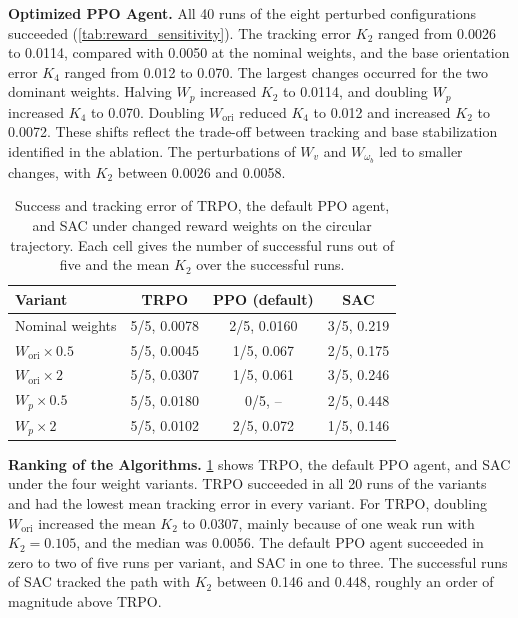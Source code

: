 \documentclass{ieeeaccess}
\begin{document}
\textbf{Optimized PPO Agent.} All 40 runs of the eight perturbed configurations succeeded
(\cref{tab:reward_sensitivity}). The tracking error $K_2$ ranged from 0.0026 to 0.0114, compared with
0.0050 at the nominal weights, and the base orientation error $K_4$ ranged from 0.012 to 0.070. The largest
changes occurred for the two dominant weights. Halving $W_p$ increased $K_2$ to 0.0114, and doubling $W_p$
increased $K_4$ to 0.070. Doubling $W_{\mathrm{ori}}$ reduced $K_4$ to 0.012 and increased $K_2$ to 0.0072.
These shifts reflect the trade-off between tracking and base stabilization identified in the ablation. The
perturbations of $W_v$ and $W_{\omega_b}$ led to smaller changes, with $K_2$ between 0.0026 and 0.0058.

\begin{table}[!t]
    \centering
    \caption{Success and tracking error of TRPO, the default PPO agent, and SAC under changed reward weights
    on the circular trajectory. Each cell gives the number of successful runs out of five and the mean $K_2$
    over the successful runs.}
    \label{tab:reward_ranking}
    \renewcommand{\arraystretch}{1.2}
    \setlength{\tabcolsep}{4pt}
    \begin{tabular}{lccc}
        \toprule
        \textbf{Variant} & \textbf{TRPO} & \textbf{PPO (default)} & \textbf{SAC} \\
        \midrule
        Nominal weights & 5/5, 0.0078 & 2/5, 0.0160 & 3/5, 0.219 \\
        $W_{\mathrm{ori}} \times 0.5$ & 5/5, 0.0045 & 1/5, 0.067 & 2/5, 0.175 \\
        $W_{\mathrm{ori}} \times 2$ & 5/5, 0.0307 & 1/5, 0.061 & 3/5, 0.246 \\
        $W_p \times 0.5$ & 5/5, 0.0180 & 0/5, -- & 2/5, 0.448 \\
        $W_p \times 2$ & 5/5, 0.0102 & 2/5, 0.072 & 1/5, 0.146 \\
        \bottomrule
    \end{tabular}
\end{table}

\textbf{Ranking of the Algorithms.} \cref{tab:reward_ranking} shows TRPO, the default PPO agent, and
SAC under the four weight variants. TRPO succeeded in all 20 runs of the variants and had the lowest
mean tracking error in every variant. For TRPO, doubling $W_{\mathrm{ori}}$ increased the mean $K_2$ to
0.0307, mainly because of one weak run with $K_2 = 0.105$, and the median was 0.0056. The default PPO
agent succeeded in zero to two of five runs per variant, and SAC in one to three. The successful runs
of SAC tracked the path with $K_2$ between 0.146 and 0.448, roughly an order of magnitude above TRPO.
\end{document}
